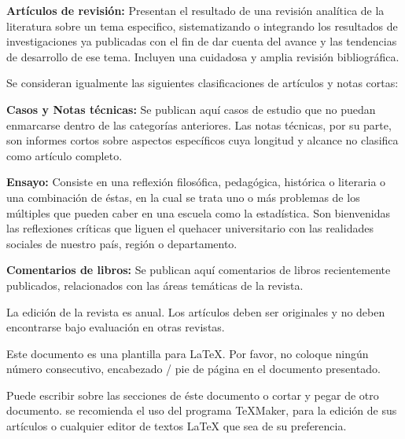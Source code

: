 \documentclass[a4paper,10pt,twoside]{article}
\begin{document}
 \textbf{Artículos de revisión:} Presentan el resultado de una revisión analítica de la literatura sobre un tema especifico, sistematizando o integrando los resultados de investigaciones ya publicadas con el fin de dar cuenta del avance y las tendencias de desarrollo de ese tema. Incluyen una cuidadosa y amplia revisión bibliográfica.

  Se consideran igualmente las siguientes clasificaciones de artículos y notas cortas:

  \textbf{Casos y Notas técnicas:} Se publican aquí casos de estudio que no puedan enmarcarse dentro de las categorías anteriores. Las notas técnicas, por su parte, son informes cortos sobre aspectos específicos cuya longitud y alcance no clasifica como artículo completo.

  \textbf{Ensayo:} Consiste en una reflexión filosófica, pedagógica, histórica o literaria o una combinación de éstas, en la cual se trata uno o más problemas de los múltiples que pueden caber en una escuela como la estadística. Son bienvenidas las reflexiones críticas que liguen el quehacer universitario con las realidades sociales de nuestro país, región o departamento.

  \textbf{Comentarios de libros:} Se publican aquí comentarios de libros recientemente publicados, relacionados con las áreas temáticas de la revista.

  La edición de la revista es anual. Los artículos deben ser originales y no deben encontrarse bajo evaluación en otras revistas.

Este documento es una plantilla para LaTeX.  Por favor, no coloque ningún número consecutivo, encabezado / pie de página en el documento presentado.

Puede escribir sobre las secciones de éste documento o cortar y pegar de otro documento. se recomienda el uso del programa TeXMaker, para la edición de sus artículos o cualquier editor de textos LaTeX que sea de su preferencia.

\end{document}
